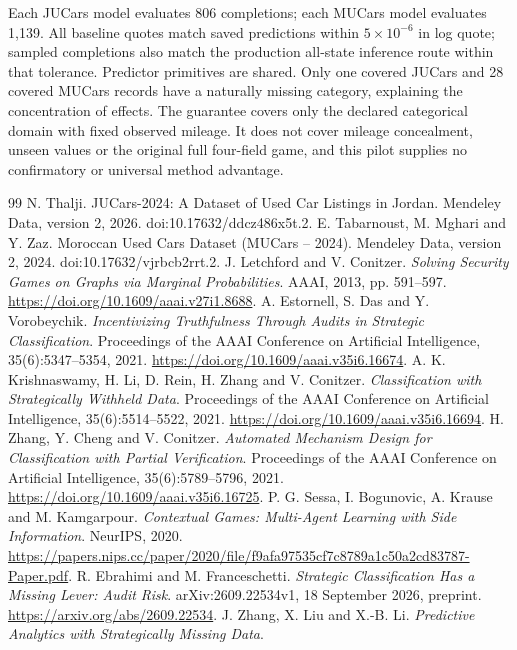 \documentclass[11pt]{article}
\begin{document}
Each JUCars model evaluates 806 completions; each MUCars model evaluates
1,139. All baseline quotes match saved predictions within $5\times10^{-6}$
in log quote; sampled completions also match the production all-state
inference route within that tolerance. Predictor primitives are shared.
Only one covered JUCars and 28 covered MUCars records have a naturally missing
category, explaining the concentration of effects. The guarantee covers only
the declared categorical domain with fixed observed mileage. It does not
cover mileage concealment, unseen values or the original full four-field
game, and this pilot supplies no confirmatory or universal method advantage.

\begin{thebibliography}{99}
 N. Thalji.
JUCars-2024: A Dataset of Used Car Listings in Jordan.
Mendeley Data, version 2, 2026. doi:10.17632/ddcz486x5t.2.
 E. Tabarnoust, M. Mghari and Y. Zaz.
Moroccan Used Cars Dataset (MUCars -- 2024).
Mendeley Data, version 2, 2024. doi:10.17632/vjrbcb2rrt.2.
 J. Letchford and V. Conitzer.
\emph{Solving Security Games on Graphs via Marginal Probabilities}.
AAAI, 2013, pp. 591--597. \url{https://doi.org/10.1609/aaai.v27i1.8688}.
 A. Estornell, S. Das and Y. Vorobeychik.
\emph{Incentivizing Truthfulness Through Audits in Strategic Classification}.
Proceedings of the AAAI Conference on Artificial Intelligence,
35(6):5347--5354, 2021. \url{https://doi.org/10.1609/aaai.v35i6.16674}.
 A. K. Krishnaswamy, H. Li, D. Rein, H. Zhang and V. Conitzer.
\emph{Classification with Strategically Withheld Data}.
Proceedings of the AAAI Conference on Artificial Intelligence,
35(6):5514--5522, 2021. \url{https://doi.org/10.1609/aaai.v35i6.16694}.
 H. Zhang, Y. Cheng and V. Conitzer.
\emph{Automated Mechanism Design for Classification with Partial Verification}.
Proceedings of the AAAI Conference on Artificial Intelligence,
35(6):5789--5796, 2021.
\url{https://doi.org/10.1609/aaai.v35i6.16725}.
 P. G. Sessa, I. Bogunovic, A. Krause and M. Kamgarpour.
\emph{Contextual Games: Multi-Agent Learning with Side Information}.
NeurIPS, 2020.
\url{https://papers.nips.cc/paper/2020/file/f9afa97535cf7c8789a1c50a2cd83787-Paper.pdf}.
 R. Ebrahimi and M. Franceschetti.
\emph{Strategic Classification Has a Missing Lever: Audit Risk}.
arXiv:2609.22534v1, 18 September 2026, preprint.
\url{https://arxiv.org/abs/2609.22534}.
 J. Zhang, X. Liu and X.-B. Li.
\emph{Predictive Analytics with Strategically Missing Data}.

\end{thebibliography}
\end{document}
